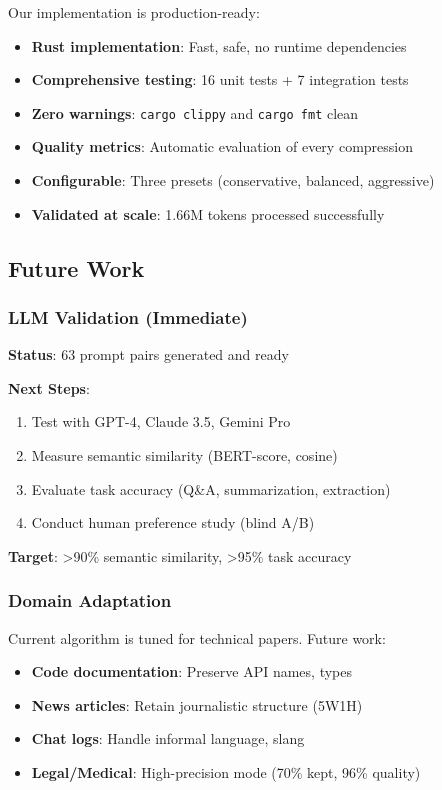Our implementation is production-ready:

\begin{itemize}
    \item \textbf{Rust implementation}: Fast, safe, no runtime dependencies
    \item \textbf{Comprehensive testing}: 16 unit tests + 7 integration tests
    \item \textbf{Zero warnings}: \texttt{cargo clippy} and \texttt{cargo fmt} clean
    \item \textbf{Quality metrics}: Automatic evaluation of every compression
    \item \textbf{Configurable}: Three presets (conservative, balanced, aggressive)
    \item \textbf{Validated at scale}: 1.66M tokens processed successfully
\end{itemize}

\subsection{Future Work}

\subsubsection{LLM Validation (Immediate)}

\textbf{Status}: 63 prompt pairs generated and ready

\textbf{Next Steps}:
\begin{enumerate}
    \item Test with GPT-4, Claude 3.5, Gemini Pro
    \item Measure semantic similarity (BERT-score, cosine)
    \item Evaluate task accuracy (Q\&A, summarization, extraction)
    \item Conduct human preference study (blind A/B)
\end{enumerate}

\textbf{Target}: >90\% semantic similarity, >95\% task accuracy

\subsubsection{Domain Adaptation}

Current algorithm is tuned for technical papers. Future work:

\begin{itemize}
    \item \textbf{Code documentation}: Preserve API names, types
    \item \textbf{News articles}: Retain journalistic structure (5W1H)
    \item \textbf{Chat logs}: Handle informal language, slang
    \item \textbf{Legal/Medical}: High-precision mode (70\% kept, 96\% quality)
\end{itemize}

